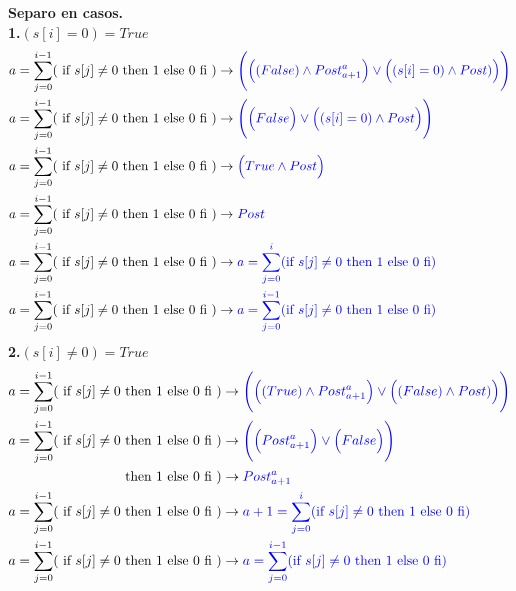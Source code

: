 \documentclass[a4paper]{article}
\begin{document}
\begin{enumerate}
   		\textbf{Separo en casos.}\medskip \\
   		\textbf{1.}$(s[i]=0)=True$\\
   		\begin{align*}
   		a=\sum_{j=0}^{i-1}(\textrm{ if }s[j] \neq 0 
    \textrm{ then 1 else 0 fi }) &\rightarrow \color{blue} \Bigg(\Big((False)\wedge
   				Post_{a+1}^{a}\Big) \vee \Big((s[i] = 0)\wedge Post)\Big)\Bigg)\\
   		a=\sum_{j=0}^{i-1}(\textrm{ if }s[j] \neq 0 
    \textrm{ then 1 else 0 fi }) &\rightarrow \color{blue} \Bigg(\Big(False\Big) \vee \Big((s[i] = 0)\wedge Post\Big)\Bigg)\\
   		a=\sum_{j=0}^{i-1}(\textrm{ if }s[j] \neq 0 
    \textrm{ then 1 else 0 fi }) &\rightarrow \color{blue} \Big(True\wedge Post\Big)\\
    	a=\sum_{j=0}^{i-1}(\textrm{ if }s[j] \neq 0 
    \textrm{ then 1 else 0 fi }) &\rightarrow \color{blue} Post\\
    	a=\sum_{j=0}^{i-1}(\textrm{ if }s[j] \neq 0 
    \textrm{ then 1 else 0 fi }) &\rightarrow \color{blue} a=\sum_{j=0}^{i}(\textrm{if }s[j] \neq 0
    \textrm{ then 1 else 0 fi})\\
    a=\sum_{j=0}^{i-1}(\textrm{ if }s[j] \neq 0 
    \textrm{ then 1 else 0 fi }) &\rightarrow \color{blue} a=\sum_{j=0}^{i-1}(\textrm{if }s[j] \neq 0
    \textrm{ then 1 else 0 fi})\\
		\end{align*}
\textbf{2.}$(s[i]\neq 0)=True$\\
   		\begin{align*}
   		a=\sum_{j=0}^{i-1}(\textrm{ if }s[j] \neq 0 
    \textrm{ then 1 else 0 fi }) &\rightarrow \color{blue} \Bigg(\Big((True)\wedge
   				Post_{a+1}^{a}\Big) \vee \Big((False)\wedge Post)\Big)\Bigg)\\
   		a=\sum_{j=0}^{i-1}(\textrm{ if }s[j] \neq 0 
    \textrm{ then 1 else 0 fi }) &\rightarrow \color{blue} \Bigg(\Big(Post_{a+1}^{a}\Big) \vee \Big(False\Big)\Bigg)\\
    \textrm{ then 1 else 0 fi }) &\rightarrow \color{blue} Post_{a+1}^{a}\\
    	a=\sum_{j=0}^{i-1}(\textrm{ if }s[j] \neq 0 
    \textrm{ then 1 else 0 fi }) &\rightarrow \color{blue} a+1=\sum_{j=0}^{i}(\textrm{if }s[j] \neq 0
    \textrm{ then 1 else 0 fi})\\
    a=\sum_{j=0}^{i-1}(\textrm{ if }s[j] \neq 0 
    \textrm{ then 1 else 0 fi }) &\rightarrow \color{blue} a=\sum_{j=0}^{i-1}(\textrm{if }s[j] \neq 0
    \textrm{ then 1 else 0 fi})\\
		\end{align*}
	
\end{enumerate}
\end{document}
